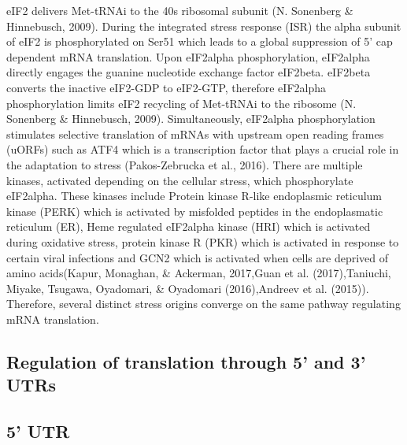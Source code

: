 \documentclass[12pt,openany]{book}
\begin{document}
eIF2 delivers Met-tRNAi to the 40s ribosomal subunit (N. Sonenberg \&
Hinnebusch, 2009). During the integrated stress response (ISR) the alpha
subunit of eIF2 is phosphorylated on Ser51 which leads to a global
suppression of 5' cap dependent mRNA translation. Upon eIF2alpha
phosphorylation, eIF2alpha directly engages the guanine nucleotide
exchange factor eIF2beta. eIF2beta converts the inactive eIF2-GDP to
eIF2-GTP, therefore eIF2alpha phosphorylation limits eIF2 recycling of
Met-tRNAi to the ribosome (N. Sonenberg \& Hinnebusch, 2009).
Simultaneously, eIF2alpha phosphorylation stimulates selective
translation of mRNAs with upstream open reading frames (uORFs) such as
ATF4 which is a transcription factor that plays a crucial role in the
adaptation to stress (Pakos-Zebrucka et al., 2016). There are multiple
kinases, activated depending on the cellular stress, which phosphorylate
eIF2alpha. These kinases include Protein kinase R-like endoplasmic
reticulum kinase (PERK) which is activated by misfolded peptides in the
endoplasmatic reticulum (ER), Heme regulated eIF2alpha kinase (HRI)
which is activated during oxidative stress, protein kinase R (PKR) which
is activated in response to certain viral infections and GCN2 which is
activated when cells are deprived of amino acids(Kapur, Monaghan, \&
Ackerman, 2017,Guan et al. (2017),Taniuchi, Miyake, Tsugawa, Oyadomari,
\& Oyadomari (2016),Andreev et al. (2015)). Therefore, several distinct
stress origins converge on the same pathway regulating mRNA translation.

\subsection{Regulation of translation through 5’ and 3’ UTRs} \label{UTR}

\subsection{5' UTR}
\end{document}
